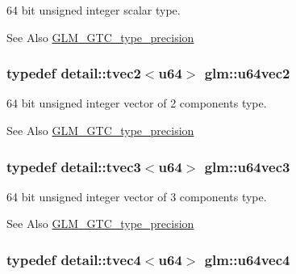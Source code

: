 64 bit unsigned integer scalar type. 

\begin{DoxySeeAlso}{See Also}
\hyperlink{group__gtc__type__precision}{G\-L\-M\-\_\-\-G\-T\-C\-\_\-type\-\_\-precision} 
\end{DoxySeeAlso}
\hypertarget{group__gtc__type__precision_gad17df8c10793777ec3081fc40b801935}{
\subsubsection[{u64vec2}]{\setlength{\rightskip}{0pt plus 5cm}typedef detail\-::tvec2$<$u64$>$ {\bf glm\-::u64vec2}}}\label{group__gtc__type__precision_gad17df8c10793777ec3081fc40b801935}


64 bit unsigned integer vector of 2 components type. 

\begin{DoxySeeAlso}{See Also}
\hyperlink{group__gtc__type__precision}{G\-L\-M\-\_\-\-G\-T\-C\-\_\-type\-\_\-precision} 
\end{DoxySeeAlso}
\hypertarget{group__gtc__type__precision_gaf3e98e85d5dd32134bf6235db89c9629}{
\subsubsection[{u64vec3}]{\setlength{\rightskip}{0pt plus 5cm}typedef detail\-::tvec3$<$u64$>$ {\bf glm\-::u64vec3}}}\label{group__gtc__type__precision_gaf3e98e85d5dd32134bf6235db89c9629}


64 bit unsigned integer vector of 3 components type. 

\begin{DoxySeeAlso}{See Also}
\hyperlink{group__gtc__type__precision}{G\-L\-M\-\_\-\-G\-T\-C\-\_\-type\-\_\-precision} 
\end{DoxySeeAlso}
\hypertarget{group__gtc__type__precision_ga550e091ec7bcd4aff560a8f5c5ff539f}{
\subsubsection[{u64vec4}]{\setlength{\rightskip}{0pt plus 5cm}typedef detail\-::tvec4$<$u64$>$ {\bf glm\-::u64vec4}}}\label{group__gtc__type__precision_ga550e091ec7bcd4aff560a8f5c5ff539f}



